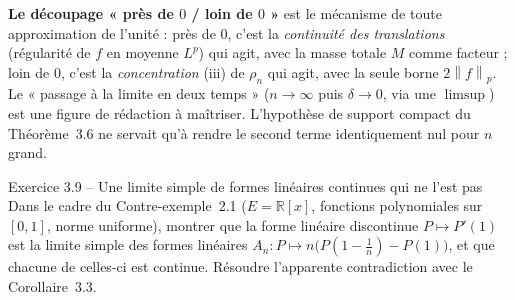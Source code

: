\documentclass[11pt,a4paper]{article}
\newcommand{\R}{\mathbb{R}}
\newcommand{\norm}[1]{\left\|#1\right\|}
\theoremstyle{definition}
\begin{document}
\begin{pointcle}
\textbf{Le découpage « près de $0$ / loin de $0$ »} est le mécanisme de toute approximation de l'unité : près de $0$, c'est la \emph{continuité des translations} (régularité de $f$ en moyenne $L^p$) qui agit, avec la masse totale $M$ comme facteur ; loin de $0$, c'est la \emph{concentration} (iii) de $\rho_n$ qui agit, avec la seule borne $2\norm f_p$. Le « passage à la limite en deux temps » ($n\to\infty$ puis $\delta\to0$, via une $\limsup$) est une figure de rédaction à maîtriser. L'hypothèse de support compact du Théorème~3.6 ne servait qu'à rendre le second terme identiquement nul pour $n$ grand.
\end{pointcle}

\begin{exo}{Exercice 3.9 -- Une limite simple de formes linéaires continues qui ne l'est pas}
Dans le cadre du Contre-exemple~2.1 ($E=\R[x]$, fonctions polynomiales sur $[0,1]$, norme uniforme), montrer que la forme linéaire discontinue $P\mapsto P'(1)$ est la limite simple des formes linéaires $A_n:P\mapsto n\big(P(1-\tfrac1n)-P(1)\big)$, et que chacune de celles-ci est continue. Résoudre l'apparente contradiction avec le Corollaire~3.3.
\end{exo}
\end{document}
